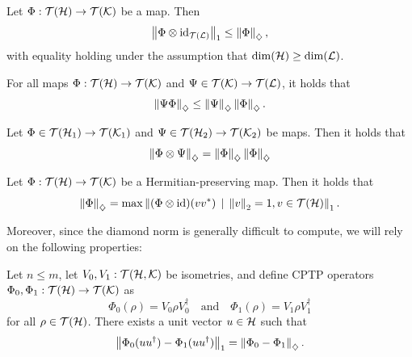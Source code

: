 \begin{theorem} \cite[Theorem 3.46]{watrous2018theory} \label{thm_diamond_otimes_id}
  Let \(\Phi : \mathcal{T}(\mathcal{H}) \to \mathcal{T}(\mathcal{K})\) be a map. Then
\[
\left\lVert \Phi \otimes \mathrm{id}_{\mathcal{T}(\mathcal{L})} \right\rVert_{1} \leq \left\lVert \Phi \right\rVert_{\diamondsuit},
\]
with equality holding under the assumption that $\dim(\mathcal{H}) \geq \dim(\mathcal{L})$.
\end{theorem}

\begin{proposition} \cite[Proposition 3.48]{watrous2018theory} \label{prop:diamond_submult}
  For all maps \(\Phi : \mathcal{T}(\mathcal{H}) \to \mathcal{T}(\mathcal{K})\) and \(\Psi \in \mathcal{T}(\mathcal{K}) \to \mathcal{T}(\mathcal{L})\), it holds that
  \begin{align*}
    \left\lVert \Psi \Phi \right\rVert_{\diamondsuit} \leq  \left\lVert \Psi \right\rVert_{\diamondsuit} \left\lVert \Phi \right\rVert_{\diamondsuit}. 
  \end{align*}
\end{proposition}

\begin{theorem} \cite[Theorem 3.49]{watrous2018theory}\label{thm:diamond_tensor_comp}
  Let $\Phi \in \mathcal{T}(\mathcal{H}_1) \to \mathcal{T}(\mathcal{K}_1)$ and \(\Psi \in \mathcal{T}(\mathcal{H}_2) \to \mathcal{T}(\mathcal{K}_2)\) be maps. Then it holds that
\[
\left\lVert \Phi \otimes \Psi \right\rVert_{\diamondsuit} = \left\lVert \Phi \right\rVert_{\diamondsuit}\left\lVert \Phi \right\rVert_{\diamondsuit}
\]
\end{theorem}



\begin{theorem} \cite[Theorem 3.51]{watrous2018theory} \label{thm_hem-pres_vv*}
  Let $\Phi:  \mathcal{T}(\mathcal{H}) \to \mathcal{T}(\mathcal{K})$ be a Hermitian-preserving map. Then it holds that
\[
\left\lVert \Phi \right\rVert_{\diamondsuit} = \max \left\lVert (\Phi \otimes \mathrm{id})(vv^*) \, \mid \, \left\lVert v \right\rVert_{2} =1 , v\in \mathcal{T}(\mathcal{H})  \right\rVert_{1}.
\]
\end{theorem}

Moreover, since the diamond norm is generally difficult to compute, we will rely on the following properties:

\begin{theorem} \cite[Theorem 3.55]{watrous2018theory} \label{theorem:diamond_iso}
  Let  $ n \leq m$, let $V_0,V_1: \mathcal{T}(\mathcal{H},\mathcal{K})$ be isometries, and define CPTP operators $\Phi_0,\Phi_1:\mathcal{T}(\mathcal{H}) \to \mathcal{T}(\mathcal{K})$ as
\[
\Phi_0(\rho) = V_0 \rho V_0^\dag \quad \text{and} \quad \Phi_1(\rho) = V_1 \rho V_1^\dag
\]
for all $\rho \in \mathcal{T}(\mathcal{H})$. There exists a unit vector $u \in \mathcal{H} $ such that
\[
\left\lVert \Phi_0(uu^\dag) - \Phi_1(uu^\dag) \right\rVert_{1} = \left\lVert \Phi_0 - \Phi_1 \right\rVert_{\diamondsuit}.
\]
\end{theorem}

